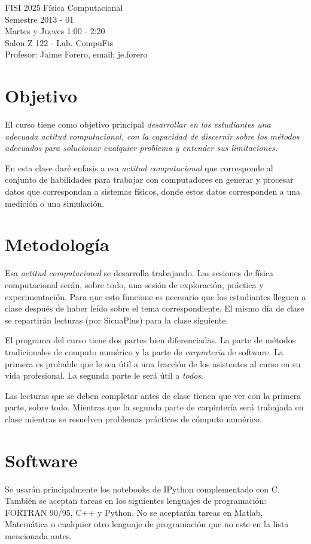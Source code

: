 \documentclass[12pt]{article}
\begin{document}
\noindent
FISI 2025 F\'isica Computacional \\
Semestre 2013 - 01\\
Martes y Jueves 1:00 - 2:20 \\
Salon Z 122 - Lab. CompuFis\\
Profesor: Jaime Forero, email: je.forero\\


\section*{Objetivo}
El curso tiene como objetivo principal \emph{desarrollar en los
  estudiantes una adecuada actitud computacional, con la capacidad de
  discernir sobre los m\'etodos adecuados para solucionar cualquier
  problema y entender sus limitaciones.} 
 
En esta clase dar\'e enfasis a esa \emph{actitud computacional} que
corresponde al conjunto de habilidades para trabajar con computadores
en generar y procesar datos que correspondan a sistemas f\'isicos,
donde estos datos corresponden a una medici\'on o una simulaci\'on. 

\section*{Metodolog\'ia}
Esa \emph{actitud computacional} se desarrolla trabajando. Las
sesiones de f\'isica computacional ser\'an, sobre todo, una sesi\'on
de exploraci\'on, pr\'actica y experimentaci\'on. Para que esto
funcione es necesario que los estudiantes lleguen a clase despu\'es de
haber le\'ido sobre el tema correspondiente. El mismo d\'ia de clase
se repartir\'an lecturas (por SicuaPlus) para la clase siguiente. 

El programa del curso tiene dos partes bien diferenciadas. La parte de
m\'etodos tradicionales de computo num\'erico y la parte de
\emph{carpinter\'ia} de software. La primera es probable que le sea
\'util a una fracci\'on de los asistentes al curso en su vida
profesional. La segunda parte le ser\'a \'util a \emph{todos}. 

Las lecturas que se deben completar antes de clase tienen que ver con
la primera parte, sobre todo. Mientras que la segunda parte de
carpinter\'ia ser\'a trabajada en clase mientras se resuelven
problemas pr\'acticos de c\'omputo num\'erico. 

\section*{Software}
\noindent Se usar\'an principalmente los notebooks de IPython
complementado con C. Tambi\'en se aceptan tareas en los siguientes
lenguajes de programaci\'on: FORTRAN 90/95, C++ y Python. No se
aceptar\'an tareas en Matlab, Matem\'atica o cualquier otro lenguaje
de programaci\'on que no este en la lista mencionada antes.  
\end{document}
